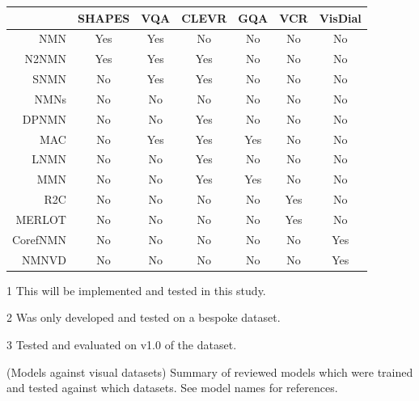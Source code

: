 \begin{table}[]
    \begin{threeparttable}
        \small
        \begin{tabular}{@{}rcccccc@{}}
            \toprule
                                                        & SHAPES & VQA          & CLEVR & GQA & VCR         & VisDial \\ \midrule
            NMN\cite{andreas_neural_2016}               & Yes    & Yes          & No    & No  & No          & No      \\
            N2NMN\cite{hu_learning_2017}                & Yes    & Yes          & Yes   & No  & No          & No      \\
            SNMN\cite{hu_explainable_2019}              & No     & Yes          & Yes   & No  & No\tnote{1} & No      \\
            NMNs\pm{}\cite{chen_teaching_2022}\tnote{2} & No     & No           & No    & No  & No          & No      \\
            DPNMN\cite{su_toward_2020}                  & No     & No           & Yes   & No  & No          & No      \\
            MAC\cite{hudson_compositional_2018}         & No     & Yes\tnote{3} & Yes   & Yes & No          & No      \\
            LNMN\cite{pahuja_learning_2019}             & No     & No           & Yes   & No  & No          & No      \\
            MMN\cite{chen_meta_2020}                    & No     & No           & Yes   & Yes & No          & No      \\
            R2C\cite{zellers_recognition_2019}          & No     & No           & No    & No  & Yes         & No      \\
            MERLOT\cite{zellers_merlot_2022}            & No     & No           & No    & No  & Yes         & No      \\
            CorefNMN\cite{kottur_visual_2018}           & No     & No           & No    & No  & No          & Yes     \\
            NMNVD\cite{cho_visual_2021}                 & No     & No           & No    & No  & No          & Yes     \\ \bottomrule
        \end{tabular}
        \begin{tablenotes}
            \item[1] This will be implemented and tested in this study.
            \item[2] Was only developed and tested on a bespoke dataset\cite{chen_teaching_2022}.
            \item[3] Tested and evaluated on v1.0 of the dataset\cite{hudson_compositional_2018}.
        \end{tablenotes}
    \end{threeparttable}
    \captionsource(Models against visual datasets)
    {Summary of reviewed models which were trained and tested against which datasets.\label{tab:models_against_datasets}}
    {See model names for references.}
\end{table}

